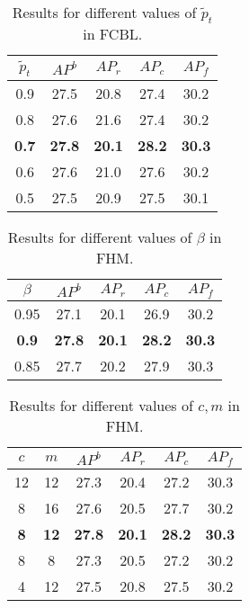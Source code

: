 \documentclass[lettersize,journal]{IEEEtran}
\begin{document}
\begin{table}[t]
    \renewcommand\arraystretch{0.9}
    \centering
    \caption{Results for different values of $\tilde{p}_{t}$ in FCBL.}
    \begin{tabular}{c|c|ccc}
    \toprule
    $\tilde{p}_{t}$ & $AP^b$  & $AP_r$  & $AP_c$  & $AP_f$  \\
    \midrule
    0.9 & 27.5 & 20.8 & 27.4 & 30.2 \\
    0.8 & 27.6 & 21.6 & 27.4 & 30.2 \\
    \textbf{0.7} & \textbf{27.8} & \textbf{20.1} & \textbf{28.2} & \textbf{30.3} \\
    0.6 & 27.6 & 21.0 & 27.6 & 30.2 \\
    0.5 & 27.5 & 20.9 & 27.5 & 30.1 \\
    \bottomrule
    \end{tabular}
    \label{tab:thres}
    \vspace{-4mm}
\end{table}

\begin{table}[t]
        \renewcommand\arraystretch{0.9}
        \centering
        \caption{Results for different values of $\beta$ in FHM.}
        \begin{tabular}{c|c|ccc}
        \toprule
        $\beta$         & $AP^b$  & $AP_r$  & $AP_c$  & $AP_f$           \\
        \midrule
        0.95 & 27.1 & 20.1 & 26.9 & 30.2 \\
        \textbf{0.9} & \textbf{27.8} & \textbf{20.1} & \textbf{28.2} & \textbf{30.3} \\
        0.85         & 27.7 &  20.2 & 27.9 & 30.3 \\
        \bottomrule
        \end{tabular}
        \label{tab:beta}
        \vspace{-4mm}
\end{table}

\begin{table}[t]
    \renewcommand\arraystretch{0.9}
    \centering
    \caption{Results for different values of $c,m$ in FHM.}
    \begin{tabular}{cc|c|ccc}
    \toprule
    $c$  & $m$ & $AP^b$   & $AP_r$  & $AP_c$  & $AP_f$  \\
    \midrule
    12 & 12 & 27.3 & 20.4 & 27.2 & 30.3 \\
    8 & 16 & 27.6 & 20.5 & 27.7 & 30.2 \\
    \textbf{8}  & \textbf{12} & \textbf{27.8} & \textbf{20.1} & \textbf{28.2} & \textbf{30.3} \\
    8  & 8 & 27.3 & 20.5 & 27.2 & 30.2 \\
    4  & 12 & 27.5 & 20.8 & 27.5 & 30.2 \\
    \bottomrule
    \end{tabular}
    \label{tab:km}
    \vspace{-4mm}
\end{table}
\end{document}
